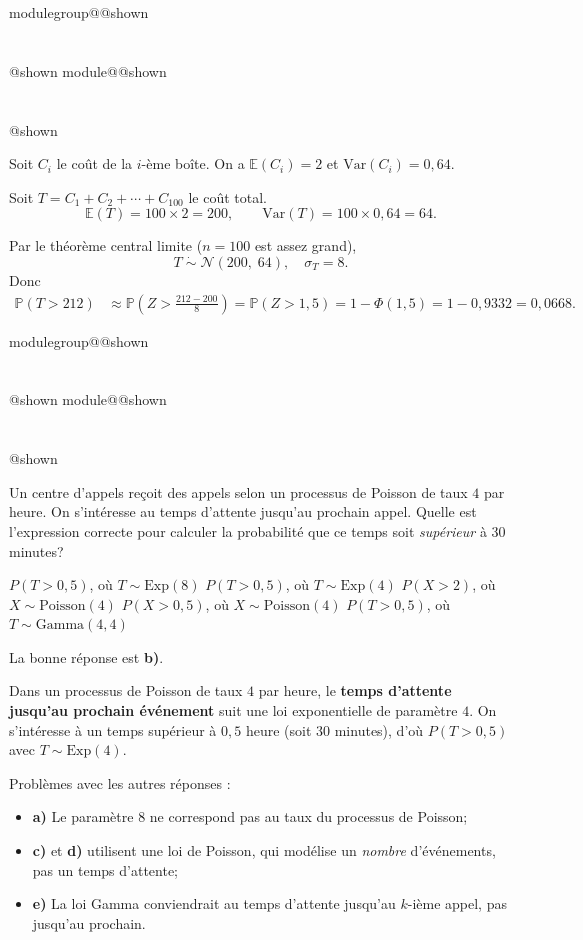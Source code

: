 \documentclass{Evaluation}
\makeatletter
\newcommand{\currentmodulekey}{}
\newcommand{\currentmoduletitle}{}
\newcommand{\currentgroupkey}{}
\newcommand{\currentgrouptitle}{}
\newcommand{\showmoduleifneeded}{%
  \ifx\currentgroupkey\empty\else
    \expandafter\ifx\csname modulegroup@\currentgroupkey @shown\endcsname\relax
      \section*{\currentgrouptitle}%
      \expandafter\gdef\csname modulegroup@\currentgroupkey @shown\endcsname{1}%
    \fi
  \fi
  \expandafter\ifx\csname module@\currentmodulekey @shown\endcsname\relax
    \section*{\currentmoduletitle}%
    \expandafter\gdef\csname module@\currentmodulekey @shown\endcsname{1}%
  \fi
}
\newenvironment{H26r}{\showmoduleifneeded}{}
\makeatother
\begin{document}
\begin{questions}
\begin{H26r}
\begin{parts}
    \begin{solution}
    Soit $C_i$ le coût de la $i$-ème boîte. On a $\mathbb{E}(C_i)=2$ et $\text{Var}(C_i)=0{,}64$.

    Soit $T = C_1 + C_2 + \cdots + C_{100}$ le coût total.
    \[
    \mathbb{E}(T) = 100 \times 2 = 200, \qquad
    \text{Var}(T) = 100 \times 0{,}64 = 64.
    \]

    Par le théorème central limite ($n=100$ est assez grand),
    \[
    T \;\dot\sim\; \mathcal{N}(200,\;64), \quad \sigma_T = 8.
    \]
    Donc
    \begin{align*}
    \mathbb{P}(T > 212)
    &\approx \mathbb{P}\!\left(Z > \frac{212 - 200}{8}\right)
    = \mathbb{P}(Z > 1{,}5)
    = 1 - \Phi(1{,}5)
    = 1 - 0{,}9332
    = 0{,}0668.
    \end{align*}
    \end{solution}
\end{parts}
\end{H26r}

\begin{H26r}
\question {} %
Un centre d'appels reçoit des appels selon un processus de Poisson de taux $4$ par heure. On s'intéresse au temps d'attente jusqu'au prochain appel. Quelle est l'expression correcte pour calculer la probabilité que ce temps soit \emph{supérieur} à $30$ minutes?\\

\begin{checkboxes}
\choice $P(T>0{,}5)$, où $T\sim \mathrm{Exp}(8)$
\correctchoice $P(T>0{,}5)$, où $T\sim \mathrm{Exp}(4)$
\choice $P(X>2)$, où $X\sim \mathrm{Poisson}(4)$
\choice $P(X>0{,}5)$, où $X\sim \mathrm{Poisson}(4)$
\choice $P(T>0{,}5)$, où $T\sim \mathrm{Gamma}(4,4)$
\end{checkboxes}

\begin{solution}
La bonne réponse est \textbf{b)}.

Dans un processus de Poisson de taux $4$ par heure, le \textbf{temps d'attente jusqu'au prochain événement} suit une loi exponentielle de paramètre $4$. On s'intéresse à un temps supérieur à $0{,}5$ heure (soit 30 minutes), d'où $P(T>0{,}5)$ avec $T\sim\mathrm{Exp}(4)$.

Problèmes avec les autres réponses :
\begin{itemize}
\item \textbf{a)} Le paramètre $8$ ne correspond pas au taux du processus de Poisson;
\item \textbf{c)} et \textbf{d)} utilisent une loi de Poisson, qui modélise un \emph{nombre} d'événements, pas un temps d'attente;
\item \textbf{e)} La loi Gamma conviendrait au temps d'attente jusqu'au $k$-ième appel, pas jusqu'au prochain.
\end{itemize}
\end{solution}
\end{H26r}


\end{questions}
\end{document}
